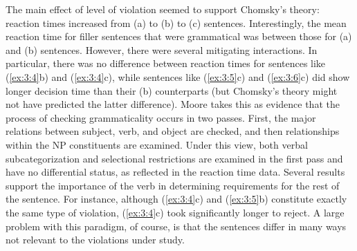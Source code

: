 \noindent
The main effect of level of violation seemed to support Chomsky's theory: reaction times increased from (a) to (b) to (c) sentences. Interestingly, the mean reaction time for filler sentences that were grammatical was between those for (a) and
(b) sentences. However, there were several mitigating interactions. In particular, there was no difference between reaction times for sentences like (\ref{ex:3:4}b) and (\ref{ex:3:4}c), while sentences like (\ref{ex:3:5}c) and (\ref{ex:3:6}c) did show longer decision time than their
(b) counterparts (but Chomsky's theory might not have predicted the latter difference). Moore takes this as evidence that the process of checking grammaticality occurs in two passes. First, the major relations between subject, verb, and object are checked, and then relationships within the NP constituents are examined. Under this view, both verbal subcategorization and selectional restrictions are examined in the first pass and have no differential status, as reflected in the reaction time data. Several results support the importance of the verb in determining requirements for the rest of the sentence. For instance, although (\ref{ex:3:4}c) and (\ref{ex:3:5}b) constitute exactly the same type of violation, (\ref{ex:3:4}c) took significantly longer to reject. A large problem with this paradigm, of course, is that the sentences differ in many ways not relevant to the violations under study.


